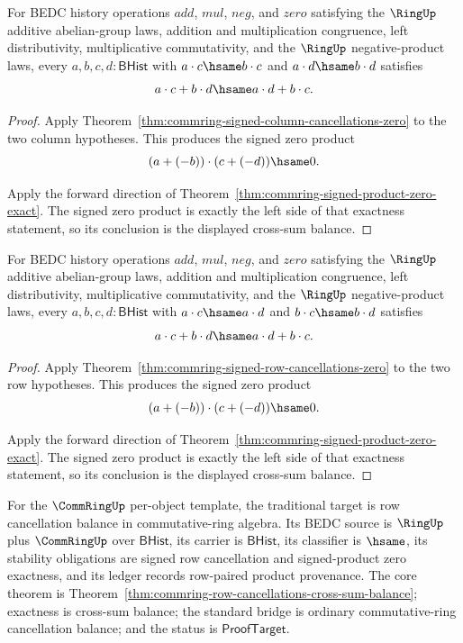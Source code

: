 \begin{theorem}
\label{thm:commring-column-cancellations-cross-sum-balance}
For BEDC history operations $add$, $mul$, $neg$, and $zero$ satisfying the
$\RingUp$ additive abelian-group laws, addition and multiplication
congruence, left distributivity, multiplicative commutativity, and the
$\RingUp$ negative-product laws, every $a,b,c,d : \mathsf{BHist}$ with
$a\cdot c\hsame b\cdot c$ and $a\cdot d\hsame b\cdot d$ satisfies
$$
a\cdot c+b\cdot d\hsame a\cdot d+b\cdot c .
$$
\end{theorem}
\begin{proof}
Apply Theorem~\ref{thm:commring-signed-column-cancellations-zero} to the two
column hypotheses. This produces the signed zero product
$$
(a+(-b))\cdot(c+(-d))\hsame0.
$$

Apply the forward direction of
Theorem~\ref{thm:commring-signed-product-zero-exact}. The signed zero product
is exactly the left side of that exactness statement, so its conclusion is the
displayed cross-sum balance.
\end{proof}

\begin{theorem}
\label{thm:commring-row-cancellations-cross-sum-balance}
For BEDC history operations $add$, $mul$, $neg$, and $zero$ satisfying the
$\RingUp$ additive abelian-group laws, addition and multiplication
congruence, left distributivity, multiplicative commutativity, and the
$\RingUp$ negative-product laws, every $a,b,c,d : \mathsf{BHist}$ with
$a\cdot c\hsame a\cdot d$ and $b\cdot c\hsame b\cdot d$ satisfies
$$
a\cdot c+b\cdot d\hsame a\cdot d+b\cdot c .
$$
\end{theorem}
\begin{proof}
Apply Theorem~\ref{thm:commring-signed-row-cancellations-zero} to the two
row hypotheses. This produces the signed zero product
$$
(a+(-b))\cdot(c+(-d))\hsame0.
$$

Apply the forward direction of
Theorem~\ref{thm:commring-signed-product-zero-exact}. The signed zero product
is exactly the left side of that exactness statement, so its conclusion is the
displayed cross-sum balance.
\end{proof}

For the $\CommRingUp$ per-object template, the traditional target is row
cancellation balance in commutative-ring algebra. Its BEDC source is
$\RingUp$ plus $\CommRingUp$ over $\mathsf{BHist}$, its carrier is
$\mathsf{BHist}$, its classifier is $\hsame$, its stability obligations are
signed row cancellation and signed-product zero exactness, and its ledger
records row-paired product provenance. The core theorem is
Theorem~\ref{thm:commring-row-cancellations-cross-sum-balance}; exactness is
cross-sum balance; the standard bridge is ordinary commutative-ring
cancellation balance; and the status is $\mathsf{ProofTarget}$.

